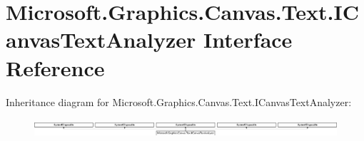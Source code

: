 \hypertarget{interface_microsoft_1_1_graphics_1_1_canvas_1_1_text_1_1_i_canvas_text_analyzer}{}\section{Microsoft.\+Graphics.\+Canvas.\+Text.\+I\+Canvas\+Text\+Analyzer Interface Reference}
\label{interface_microsoft_1_1_graphics_1_1_canvas_1_1_text_1_1_i_canvas_text_analyzer}
Inheritance diagram for Microsoft.\+Graphics.\+Canvas.\+Text.\+I\+Canvas\+Text\+Analyzer\+:\begin{figure}[H]
\begin{center}
\leavevmode
\includegraphics[height=0.687117cm]{interface_microsoft_1_1_graphics_1_1_canvas_1_1_text_1_1_i_canvas_text_analyzer}
\end{center}
\end{figure}
